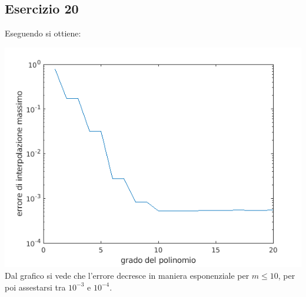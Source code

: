 \subsection{Esercizio 20}

Eseguendo  si ottiene:

\includegraphics[width = \linewidth]{capitolo4/squares.png}
Dal grafico si vede che l'errore decresce in maniera esponenziale per $m \le 10$, per poi assestarsi tra $10^{-3}$ e $10^{-4}$.